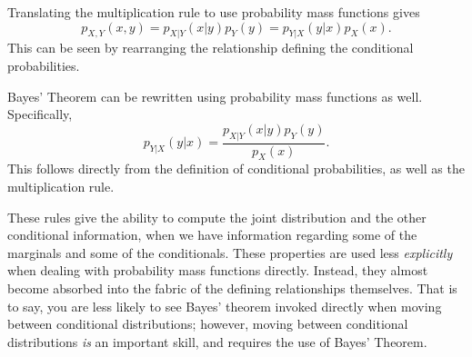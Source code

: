 \documentclass[
  letterpaper,
  DIV=11,
  numbers=noendperiod]{scrreprt}
\theoremstyle{definition}
\theoremstyle{definition}
\theoremstyle{definition}
\theoremstyle{remark}
\begin{document}
\begin{tcolorbox}[enhanced jigsaw, coltitle=black, colframe=quarto-callout-tip-color-frame, colbacktitle=quarto-callout-tip-color!10!white, bottomrule=.15mm, opacitybacktitle=0.6, colback=white, toptitle=1mm, arc=.35mm, leftrule=.75mm, bottomtitle=1mm, opacityback=0, breakable, rightrule=.15mm, title={Multiplication Rule (with Probability Mass Functions)}, left=2mm, titlerule=0mm, toprule=.15mm]

Translating the multiplication rule to use probability mass functions
gives \[p_{X,Y}(x,y) = p_{X|Y}(x|y)p_Y(y) = p_{Y|X}(y|x)p_X(x).\] This
can be seen by rearranging the relationship defining the conditional
probabilities.

\end{tcolorbox}

\begin{tcolorbox}[enhanced jigsaw, coltitle=black, colframe=quarto-callout-tip-color-frame, colbacktitle=quarto-callout-tip-color!10!white, bottomrule=.15mm, opacitybacktitle=0.6, colback=white, toptitle=1mm, arc=.35mm, leftrule=.75mm, bottomtitle=1mm, opacityback=0, breakable, rightrule=.15mm, title={Bayes' Theorem (with Probability Mass Functions)}, left=2mm, titlerule=0mm, toprule=.15mm]

Bayes' Theorem can be rewritten using probability mass functions as
well. Specifically,
\[p_{Y|X}(y|x) = \frac{p_{X|Y}(x|y)p_Y(y)}{p_X(x)}.\] This follows
directly from the definition of conditional probabilities, as well as
the multiplication rule.

\end{tcolorbox}

These rules give the ability to compute the joint distribution and the
other conditional information, when we have information regarding some
of the marginals and some of the conditionals. These properties are used
less \emph{explicitly} when dealing with probability mass functions
directly. Instead, they almost become absorbed into the fabric of the
defining relationships themselves. That is to say, you are less likely
to see Bayes' theorem invoked directly when moving between conditional
distributions; however, moving between conditional distributions
\emph{is} an important skill, and requires the use of Bayes' Theorem.
\end{document}
